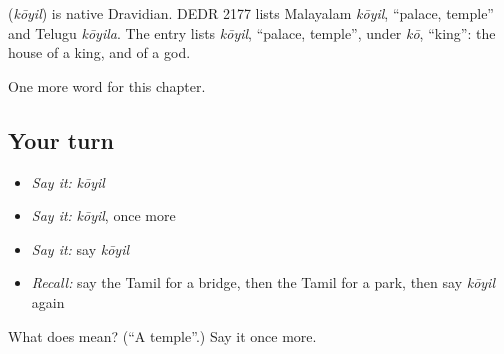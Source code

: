\begin{cousinweb}
\textbf{} (\emph{kōyil}) is native Dravidian. DEDR 2177 lists Malayalam \emph{kōyil}, \textquotedblleft{}palace, temple\textquotedblright{} and Telugu \emph{kōyila}. The entry lists \emph{kōyil}, \textquotedblleft{}palace, temple\textquotedblright{}, under \emph{kō}, \textquotedblleft{}king\textquotedblright{}: the house of a king, and of a god.
\end{cousinweb}

\begin{grammarlens}[title={What you've built}]
One more word for this chapter.
\end{grammarlens}

\subsection*{Your turn}
\begin{itemize}
\raggedright
  \item \emph{Say it:} \emph{kōyil}
  \item \emph{Say it:} \emph{kōyil}, once more
  \item \emph{Say it:} say \emph{kōyil}
  \item \emph{Recall:} say the Tamil for a bridge, then the Tamil for a park, then say \emph{kōyil} again
\end{itemize}

\begin{tcolorbox}[breakable,colback=teal!4,colframe=teal!35!black,title={Before you move on}]
What does  mean? (\textquotedblleft{}A temple\textquotedblright{}.) Say it once more.
\end{tcolorbox}
